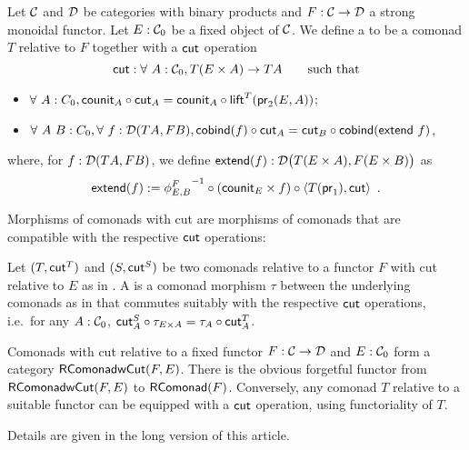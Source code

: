 \documentclass[envcountsame]{llncs}
\begin{document}
\begin{definition}%
\label{def:rel_comonad_with_cut}
 Let $\C$ and $\D$ be categories with binary products and $F:\C\to\D$ a strong monoidal functor. Let $E:\C_0$ be a fixed object of $\C$.
 We define a  to be a comonad $T$ relative to $F$ together with a $\cut$ operation 
    \[ \cut : \forall~A:\C_0, T(E\times A) \to TA \qquad \text{such that}\]
  \begin{itemize}
   \item $\forall~A:C_0, \comp{\cut_A}{\counit_A} = \comp{\lift^T(\pr_2(E,A))}{\counit_{A}}$;
   \item $\forall~A~B:C_0,\forall~f:\D(TA,FB), \comp{\cut_A}{\cobind(f)} = \comp{\cobind(\extend~f)}{\cut_B}$,
  \end{itemize}

  \noindent
  where, for $f:\D(TA,FB)$, we define $\extend(f) : \D\bigl(T(E\times A),F(E\times B)\bigr)$ as
       \[ \extend(f) := \comp{\comp{\langle T(\pr_1) , \cut \rangle}{(\counit_E\times f)}}{{\phi^{F}_{E,B}}^{-1}} \enspace . \]
  
\end{definition}

Morphisms of comonads with cut are morphisms of comonads that are compatible with the respective $\cut$ operations:

\begin{definition}%
\label{def:morphism_comonad_cut}
 Let $(T,\cut^T)$ and $(S,\cut^S)$ be two comonads relative to a functor $F$ with cut relative to $E$ as in .
 A  is a comonad morphism $\tau$ between the underlying comonads as in  that 
 commutes suitably with the respective $\cut$ operations, i.e.\ for any $A : \C_0$,
  $\comp{\tau_{E \times A}}{\cut^S_A}  = \comp{\cut^T_A}{\tau_A}$.
\end{definition}


Comonads with cut relative to a fixed functor $F:\C\to\D$ and $E:\C_0$ form a category $\RComonadWC(F,E)$.
There is the obvious forgetful functor from $\RComonadWC(F,E)$ to $\RComonad(F)$.
Conversely, any comonad $T$ relative to a suitable functor can be equipped with a $\cut$ operation, using functoriality of $T$.
%
\begin{Short}
 Details are given in the long version of this article.
\end{Short}
\end{document}
